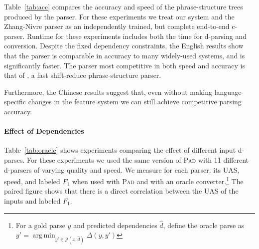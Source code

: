 \documentclass[11pt,letterpaper]{article}
\DeclareMathOperator*{\argmin}{arg\,min}
\newcommand{\ParseName}{\textsc{Pad}\xspace}
\newcommand{\nascomment}[1]{\textcolor{blue}{\bf \small [#1 --nas]}}
\begin{document}
Table~\ref{tab:acc} compares the accuracy and speed of the
phrase-structure trees produced by the parser.  For these experiments
we treat our system and the Zhang-Nivre parser as an independently
trained, but complete end-to-end c-parser. Runtime for these
experiments includes both the time for d-parsing and conversion.
Despite the fixed dependency constraints, the English results show
that the parser is comparable in accuracy to many widely-used systems,
and is significantly faster. The parser most competitive in both speed
and accuracy is that of , a fast shift-reduce
phrase-structure parser.

Furthermore, the Chinese results suggest that, even without making
language-specific changes in the feature system we can still achieve
competitive parsing accuracy.  



\paragraph{Effect of Dependencies}

Table~\ref{tab:oracle} shows experiments comparing the effect of
different input d-parses.  For these experiments we used the same version of \ParseName with
 11 different d-parsers of varying quality and
speed. We measure for each parser: its UAS, speed, and labeled $F_1$
when used with \ParseName and with an oracle converter.\footnote{For a
  gold parse $y$ and predicted dependencies $\hat{d}$, define the
  oracle parse as $y' = \argmin_{y' \in \mathcal{Y}(x, \hat{d})}
  \Delta(y, y') $} The paired figure shows that there is a direct
correlation between the UAS of the inputs and labeled $F_1$.

\end{document}
